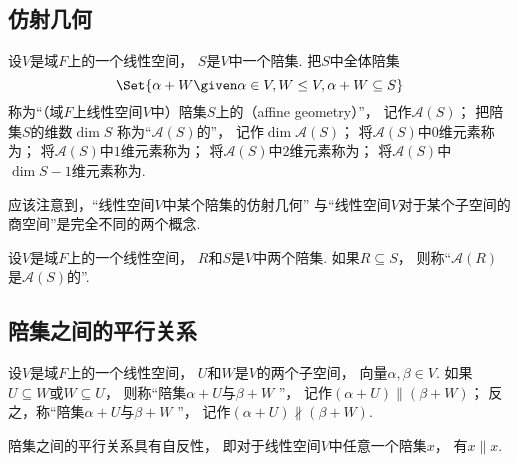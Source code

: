 \subsection{仿射几何}
\begin{definition}
设\(V\)是域\(F\)上的一个线性空间，
\(S\)是\(V\)中一个陪集.
把\(S\)中全体陪集\begin{equation*}
	\Set{
		\alpha + W
		\given
		\alpha \in V,
		W \AlgebraSubstructure V,
		\alpha + W \subseteq S
	}
\end{equation*}
称为“（域\(F\)上线性空间\(V\)中）陪集\(S\)上的（affine geometry）”，
记作\(\mathcal{A}(S)\)；
把陪集\(S\)的维数\(\dim S\)
称为“\(\mathcal{A}(S)\)的”，
记作\(\dim\mathcal{A}(S)\)；
将\(\mathcal{A}(S)\)中\(0\)维元素称为；
将\(\mathcal{A}(S)\)中\(1\)维元素称为；
将\(\mathcal{A}(S)\)中\(2\)维元素称为；
将\(\mathcal{A}(S)\)中\(\dim S-1\)维元素称为.
\end{definition}
\begin{remark}
应该注意到，“线性空间\(V\)中某个陪集的仿射几何”
与“线性空间\(V\)对于某个子空间的商空间”是完全不同的两个概念.
\end{remark}

\begin{definition}
设\(V\)是域\(F\)上的一个线性空间，
\(R\)和\(S\)是\(V\)中两个陪集.
如果\(R \subseteq S\)，
则称“\(\mathcal{A}(R)\)是\(\mathcal{A}(S)\)的”.
\end{definition}

\subsection{陪集之间的平行关系}
\begin{definition}
设\(V\)是域\(F\)上的一个线性空间，
\(U\)和\(W\)是\(V\)的两个子空间，
向量\(\alpha,\beta \in V\).
如果\(U \subseteq W\)或\(W \subseteq U\)，
则称“陪集\(\alpha + U\)与\(\beta + W\) ”，
记作\((\alpha + U) \parallel (\beta + W)\)；
反之，称“陪集\(\alpha + U\)与\(\beta + W\) ”，
记作\((\alpha + U) \nparallel (\beta + W)\).
\end{definition}

\begin{property}
陪集之间的平行关系具有自反性，
即对于线性空间\(V\)中任意一个陪集\(x\)，
有\(x \parallel x\).
\end{property}

